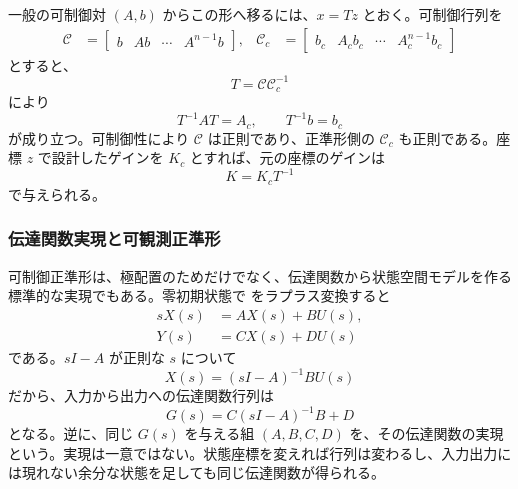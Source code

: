 一般の可制御対 $(A,b)$ からこの形へ移るには、$x=Tz$ とおく。可制御行列を
\begin{align}
  \mathcal{C}&=\begin{bmatrix}b&Ab&\cdots&A^{n-1}b\end{bmatrix},&
  \mathcal{C}_c&=\begin{bmatrix}b_c&A_cb_c&\cdots&A_c^{n-1}b_c\end{bmatrix}
\end{align}
とすると、
\begin{equation}
  T=\mathcal{C}\mathcal{C}_c^{-1}
\end{equation}
により
\begin{equation}
  T^{-1}AT=A_c,\qquad T^{-1}b=b_c
\end{equation}
が成り立つ。可制御性により $\mathcal{C}$ は正則であり、正準形側の $\mathcal{C}_c$ も正則である。座標 $z$ で設計したゲインを $K_c$ とすれば、元の座標のゲインは
\begin{equation}
  K=K_cT^{-1}
\end{equation}
で与えられる。

\subsubsection{伝達関数実現と可観測正準形}

可制御正準形は、極配置のためだけでなく、伝達関数から状態空間モデルを作る標準的な実現でもある。零初期状態で  をラプラス変換すると
\begin{align}
  sX(s)&=AX(s)+BU(s),\\
  Y(s)&=CX(s)+DU(s)
\end{align}
である。$sI-A$ が正則な $s$ について
\begin{equation}
  X(s)=(sI-A)^{-1}BU(s)
\end{equation}
だから、入力から出力への伝達関数行列は
\begin{equation}
  G(s)=C(sI-A)^{-1}B+D
  \label{eq:ss-transfer-realization}
\end{equation}
となる。逆に、同じ $G(s)$ を与える組 $(A,B,C,D)$ を、その伝達関数の実現という。実現は一意ではない。状態座標を変えれば行列は変わるし、入力出力には現れない余分な状態を足しても同じ伝達関数が得られる。

